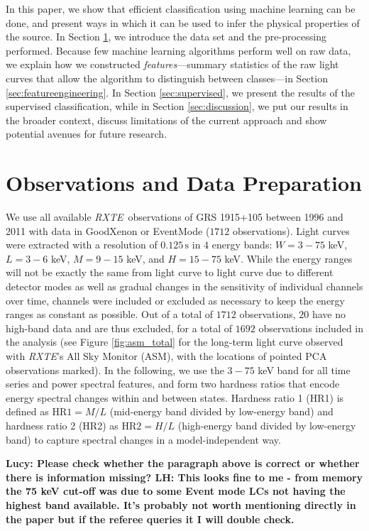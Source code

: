 \documentclass[12pt]{emulateapj}
\newcommand{\project}[1]{\textsl{#1}}
\newcommand{\rxte}{\project{RXTE}}
\begin{document}
In this paper, we show that efficient classification using machine learning can be done, and present ways in which it can be used to infer the physical properties of the source. In Section \ref{sec:observations}, we introduce the data set and the pre-processing performed. Because few machine learning algorithms perform well on raw data, we explain how we constructed \textit{features}---summary statistics of the raw light curves that allow the algorithm to distinguish between classes---in Section \ref{sec:featureengineering}. In Section \ref{sec:supervised}, we present the results of the supervised classification, while in Section \ref{sec:discussion}, we put our 
results in the broader context, discuss limitations of the current approach and show potential avenues for future research.

\section{Observations and Data Preparation}
\label{sec:observations}

We use all available \rxte\ observations of GRS 1915+105 between 1996 and 2011 with data in GoodXenon or EventMode ($1712$ observations). Light curves were extracted with a resolution of $0.125\,\mathrm{s}$ in $4$ energy bands: $W = 3 - 75$ keV, $L = 3 - 6$ keV, $M = 9 - 15$ keV, and $H = 15 - 75$ keV. While the energy ranges will not be exactly the same from light curve to light curve due to different detector modes as well as gradual changes in the sensitivity of individual channels over time, channels were included or excluded as necessary to keep the energy ranges as constant as possible. Out of a total of $1712$ observations, $20$ have no high-band data and are thus excluded, for a total of $1692$ observations included in the analysis (see Figure \ref{fig:asm_total} for the long-term light curve observed with \rxte's All Sky Monitor (ASM), with the locations of pointed PCA observations marked). 
In the following, we use the $3 - 75$ keV band for all time series and power spectral features, and form two hardness ratios that encode energy spectral changes within and between states. Hardness ratio 1 (HR1) is defined as $\mathrm{HR}1 = M/L$ (mid-energy band divided by low-energy band) and hardness ratio 2 (HR2) as $\mathrm{HR}2 = H/L$ (high-energy band divided by low-energy band) to capture spectral changes in a model-independent way.

{\bf Lucy: Please check whether the paragraph above is correct or whether there is information missing? LH: This looks fine to me - from memory the 75 keV cut-off was due to some Event mode LCs not having the highest band available. It's probably not worth mentioning directly in the paper but if the referee queries it I will double check.}
\end{document}
